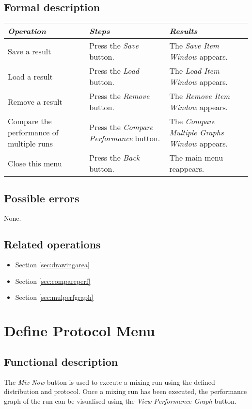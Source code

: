   \subsection*{Formal description}
  \begin{tabularx}{\textwidth}{XXX}
    \toprule
    \emph{Operation} & \emph{Steps} & \emph{Results} \\
    \midrule
    Save a result & Press the \emph{Save} button. & The \emph{Save Item Window} appears. \\
    \midrule
    Load a result & Press the \emph{Load} button. & The \emph{Load Item Window} appears. \\
    \midrule
    Remove a result & Press the \emph{Remove} button. & The \emph{Remove Item Window} appears. \\
    \midrule
    Compare the performance of multiple runs & Press the \emph{Compare Performance} button. & The \emph{Compare Multiple Graphs Window} appears. \\
    \midrule
    Close this menu & Press the \emph{Back} button. & The main menu reappears. \\
    \bottomrule
  \end{tabularx}

  \subsection*{Possible errors}
  None.
  
  \subsection*{Related operations}
  \begin{itemize}
    \item Section \ref{sec:drawingarea}
    \item Section \ref{sec:compareperf}
    \item Section \ref{sec:mulperfgraph}
  \end{itemize}

\section{Define Protocol Menu}\label{sec:defprot}
  \subsection*{Functional description}
  The \emph{Mix Now} button is used to execute a mixing run using the defined distribution and protocol. Once a mixing run has been executed, the performance graph of the run can be visualised using the \emph{View Performance Graph} button.
  
